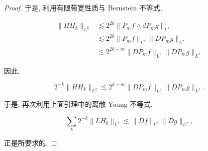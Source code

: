 \begin{proof}
于是, 利用有限带宽性质与 Bernstein 不等式,

\[
\begin{aligned}
\|HH_k\|_{L^2} &\lesssim 2^{2k} \|P_m f \wedge dP_m g\|_{L^1}\\
&\lesssim 2^{2k} \|P_m f\|_{L^2} \|DP_m g\|_{L^2}\\
&\lesssim 2^{2k-m} \|DP_m f\|_{L^2} \|DP_m g\|_{L^2}
\end{aligned}
\]

因此,

\[
2^{-k} \|HH_k\|_{L^2} \lesssim 2^{k-m} \|DP_m f\|_{L^2} \|DP_m g\|_{L^2}.
\]

于是, 再次利用上面引理中的离散 Young 不等式,

\[
\sum_k 2^{-k} \|LH_k\|_{L^2} \lesssim \|Df\|_{L^2} \|Dg\|_{L^2},
\]

正是所要求的.
\end{proof}
